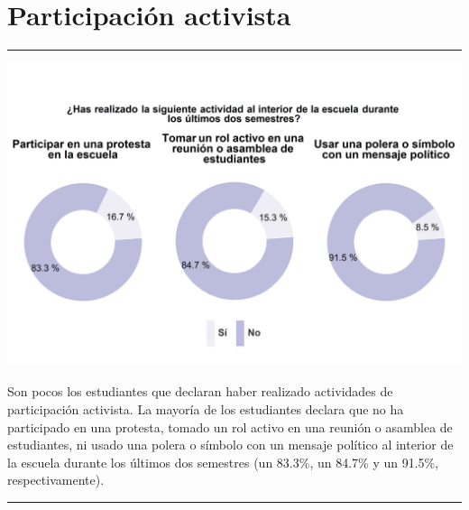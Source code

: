 \documentclass[
  14pt,
]{book}
\let\origfigure\figure
\let\endorigfigure\endfigure
\renewenvironment{figure}[1][2] {
  \expandafter\origfigure\expandafter[H]
} {
  \endorigfigure
}
\begin{document}
\hypertarget{participaciuxf3n-activista}{%
\section{Participación activista}\label{participaciuxf3n-activista}}

\begin{center}\rule{0.5\linewidth}{0.5pt}\end{center}

\begin{figure}[!ht]

{\centering \includegraphics[width=0.8\linewidth,]{images/graph_partact_esc} 

}

\caption{Participación activista al interior de la escuela}\label{fig:unnamed-chunk-54}
\end{figure}

Son pocos los estudiantes que declaran haber realizado actividades de participación activista. La mayoría de los estudiantes declara que no ha participado en una protesta, tomado un rol activo en una reunión o asamblea de estudiantes, ni usado una polera o símbolo con un mensaje político al interior de la escuela durante los últimos dos semestres (un 83.3\%, un 84.7\% y un 91.5\%, respectivamente).

\begin{center}\rule{0.5\linewidth}{0.5pt}\end{center}
\end{document}
